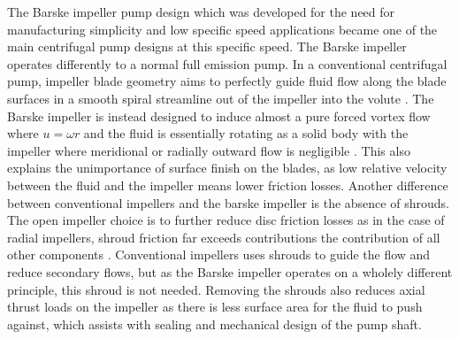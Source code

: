 The Barske impeller pump design which was developed for the need for manufacturing simplicity and low specific speed applications \cite{barskeDevelopmentUnconventionalCentrifugal1960} became one of the main centrifugal pump designs at this specific speed. The Barske impeller operates differently to a normal full emission pump. In a conventional centrifugal pump, impeller blade geometry aims to perfectly guide fluid flow along the blade surfaces in a smooth spiral streamline out of the impeller into the volute \cite{gulichCentrifugalPumps2020}. The Barske impeller is instead designed to induce almost a pure forced vortex flow where $u=\omega r$ and the fluid is essentially rotating as a solid body with the impeller \cite{barskeDevelopmentUnconventionalCentrifugal1960} where meridional or radially outward flow is negligible \cite{barskeDesignOpenImpeller}. This also explains the unimportance of surface finish on the blades, as low relative velocity between the fluid and the impeller means lower friction losses.
Another difference between conventional impellers and the barske impeller is the absence of shrouds. The open impeller choice is to further reduce disc friction losses as in the case of radial impellers, shroud friction far exceeds contributions the contribution of all other components \cite{gulichCentrifugalPumps2020}. Conventional impellers uses shrouds to guide the flow and reduce secondary flows, but as the Barske impeller operates on a wholely different principle, this shroud is not needed. Removing the shrouds also reduces axial thrust loads on the impeller as there is less surface area for the fluid to push against, which assists with sealing and mechanical design of the pump shaft.



